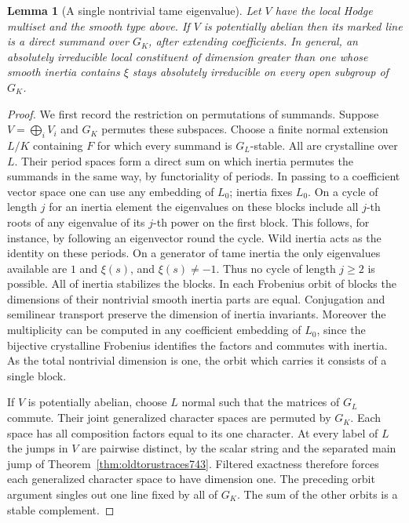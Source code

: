 \documentclass[a4paper,11pt]{article}
\newtheorem{lemma}[proposition]{Lemma}
\theoremstyle{definition}
\theoremstyle{remark}
\numberwithin{equation}{section}
\begin{document}
\begin{lemma}[A single nontrivial tame eigenvalue]
\leavevmode\label{lem:singleinertia747}
Let \(V\) have the local Hodge multiset and the smooth type above.
If \(V\) is potentially abelian then its marked line is a direct
summand over \(G_K\), after extending coefficients. In general,
an absolutely irreducible local constituent of dimension greater
than one whose smooth inertia contains \(\xi\) stays absolutely
irreducible on every open subgroup of \(G_K\).
\end{lemma}
\begin{proof}
We first record the restriction on permutations of summands.
Suppose \(V=\bigoplus_i V_i\) and \(G_K\) permutes these subspaces.
Choose a finite normal extension \(L/K\) containing \(F\) for
which every summand is \(G_L\)-stable. All are crystalline over
\(L\). Their period spaces form a direct sum on which inertia
permutes the summands in the same way, by functoriality of
periods. In passing to a coefficient vector space one can
use any embedding of \(L_0\); inertia fixes \(L_0\). On a cycle
of length \(j\) for an inertia element the eigenvalues on these
blocks include all \(j\)-th roots of any eigenvalue of its
\(j\)-th power on the first block. This follows, for instance,
by following an eigenvector round the cycle. Wild inertia acts
as the identity on these periods. On a generator of tame inertia
the only eigenvalues available are \(1\) and \(\xi(s)\), and
\(\xi(s)\ne-1\). Thus no cycle of length \(j\ge2\) is possible.
All of inertia stabilizes the blocks. In each Frobenius orbit
of blocks the dimensions of their nontrivial smooth inertia
parts are equal. Conjugation and semilinear transport preserve
the dimension of inertia invariants. Moreover the multiplicity
can be computed in any coefficient embedding of \(L_0\), since
the bijective crystalline Frobenius identifies the factors
and commutes with inertia. As the total nontrivial dimension
is one, the orbit which carries it consists of a single block.

If \(V\) is potentially abelian, choose \(L\) normal such
that the matrices of \(G_L\) commute. Their joint generalized
character spaces are permuted by \(G_K\). Each space has all
composition factors equal to its one character. At every label
of \(L\) the jumps in \(V\) are pairwise distinct, by the scalar
string and the separated main jump of
Theorem~\ref{thm:oldtorustraces743}. Filtered exactness therefore
forces each generalized character space to have dimension one.
The preceding orbit argument singles out one line fixed by
all of \(G_K\). The sum of the other orbits is a stable complement.


\end{proof}
\end{document}
